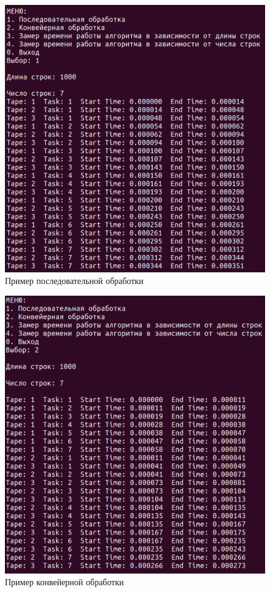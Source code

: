 \begin{figure}[H]
	\begin{center}
		\includegraphics[scale=0.3]{img/example-linear.png}
	\end{center}
	\captionsetup{justification=centering}
	\caption{Пример последовательной обработки}
	\label{img:example-linear}
\end{figure}

\begin{figure}[H]
	\begin{center}
		\includegraphics[scale=0.3]{img/example-parallel.png}
	\end{center}
	\captionsetup{justification=centering}
	\caption{Пример конвейерной обработки}
	\label{img:example-parallel}
\end{figure}

